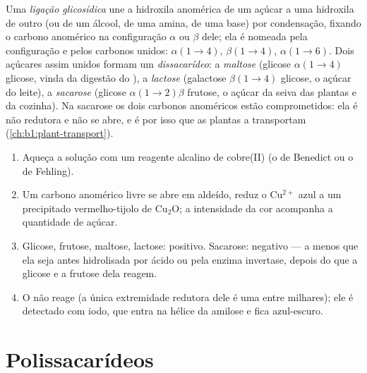 \begin{definition}\label{def:b1:carbohydrates:glycosidic}
Uma \emph{ligação glicosídica} une a
hidroxila anomérica de um açúcar a uma hidroxila de outro (ou de um
álcool, de uma amina, de uma base) por condensação, fixando o carbono
anomérico na configuração $\alpha$ ou $\beta$ dele; ela é nomeada pela
configuração e pelos carbonos unidos: $\alpha(1{\to}4)$,
$\beta(1{\to}4)$, $\alpha(1{\to}6)$. Dois açúcares assim unidos formam
um \emph{dissacarídeo}: a \emph{maltose} (glicose
$\alpha(1{\to}4)$ glicose, vinda da digestão do ), a
\emph{lactose} (galactose $\beta(1{\to}4)$ glicose, o açúcar do leite),
a \emph{sacarose} (glicose $\alpha(1{\to}2)\beta$ frutose, o açúcar da
seiva das plantas e da cozinha). Na sacarose os dois carbonos
anoméricos estão comprometidos: ela é não redutora e não se abre, e é
por isso que as plantas a transportam (\cref{ch:b1:plant-transport}).
\end{definition}

\begin{method}\label{met:b1:carbohydrates:reducing}
\begin{enumerate}
  \item Aqueça a solução com um reagente alcalino de cobre(II) (o de
        Benedict ou o de Fehling).
  \item Um carbono anomérico livre se abre em aldeído, reduz o
        $\mathrm{Cu^{2+}}$ azul a um precipitado vermelho-tijolo de
        $\mathrm{Cu_2O}$; a intensidade da cor acompanha a quantidade de
        açúcar.
  \item Glicose, frutose, maltose, lactose: positivo. Sacarose:
        negativo --- a menos que ela seja antes hidrolisada por ácido ou
        pela enzima invertase, depois do que a glicose e a frutose dela
        reagem.
  \item O  não reage (a única extremidade redutora dele é uma entre
        milhares); ele é detectado com iodo, que entra na hélice da
        amilose e fica azul-escuro.
\end{enumerate}
\end{method}

\section{Polissacarídeos}

